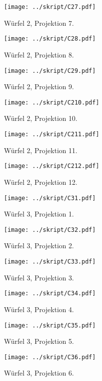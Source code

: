 \begin{figure}[htbp]
	\begin{minipage}{0.5\textwidth} 
	\texttt{[image: ../skript/C27.pdf]}
	\caption{Würfel 2, Projektion 7.}
	\end{minipage}
	\hfill
	\begin{minipage}{0.5\textwidth}
	\texttt{[image: ../skript/C28.pdf]}
	\caption{Würfel 2, Projektion 8.}
	\end{minipage}
\end{figure}

\begin{figure}[htbp]
	\begin{minipage}{0.5\textwidth} 
	\texttt{[image: ../skript/C29.pdf]}
	\caption{Würfel 2, Projektion 9.}
	\end{minipage}
	\hfill
	\begin{minipage}{0.5\textwidth}
	\texttt{[image: ../skript/C210.pdf]}
	\caption{Würfel 2, Projektion 10.}
	\end{minipage}
\end{figure}
\clearpage
\begin{figure}[htbp]
	\begin{minipage}{0.5\textwidth} 
	\texttt{[image: ../skript/C211.pdf]}
	\caption{Würfel 2, Projektion 11.}
	\end{minipage}
	\hfill
	\begin{minipage}{0.5\textwidth}
	\texttt{[image: ../skript/C212.pdf]}
	\caption{Würfel 2, Projektion 12.}
	\end{minipage}
\end{figure}

\begin{figure}[htbp]
	\begin{minipage}{0.5\textwidth} 
	\texttt{[image: ../skript/C31.pdf]}
	\caption{Würfel 3, Projektion 1.}
	\end{minipage}
	\hfill
	\begin{minipage}{0.5\textwidth}
	\texttt{[image: ../skript/C32.pdf]}
	\caption{Würfel 3, Projektion 2.}
	\end{minipage}
\end{figure}

\begin{figure}[htbp]
	\begin{minipage}{0.5\textwidth} 
	\texttt{[image: ../skript/C33.pdf]}
	\caption{Würfel 3, Projektion 3.}
	\end{minipage}
	\hfill
	\begin{minipage}{0.5\textwidth}
	\texttt{[image: ../skript/C34.pdf]}
	\caption{Würfel 3, Projektion 4.}
	\end{minipage}
\end{figure}
\clearpage
\begin{figure}[htbp]
	\begin{minipage}{0.5\textwidth} 
	\texttt{[image: ../skript/C35.pdf]}
	\caption{Würfel 3, Projektion 5.}
	\end{minipage}
	\hfill
	\begin{minipage}{0.5\textwidth}
	\texttt{[image: ../skript/C36.pdf]}
	\caption{Würfel 3, Projektion 6.}
	\end{minipage}
\end{figure}


